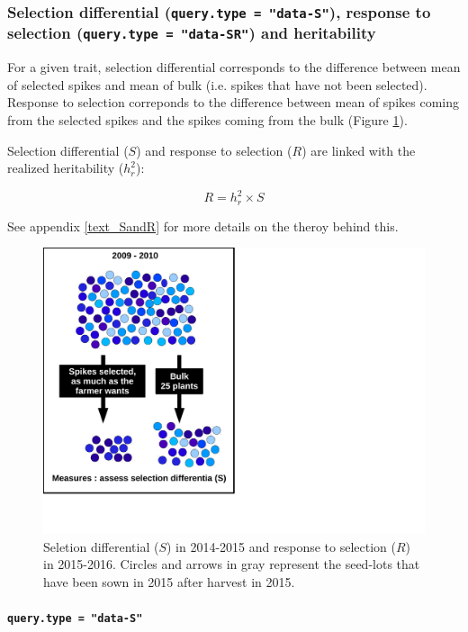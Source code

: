 \documentclass{article}\usepackage[]{graphicx}\usepackage[]{color}
\begin{document}
\subsubsection{Selection differential (\texttt{query.type = "data-S"}), response to selection (\texttt{query.type = "data-SR"}) and heritability}
\label{data-S-and-SR}

For a given trait, selection differential corresponds to the difference between mean of selected spikes and mean of bulk (i.e. spikes that have not been selected).
Response to selection correponds to the difference between mean of spikes coming from the selected spikes and the spikes coming from the bulk (Figure \ref{SandR}).

Selection differential ($S$) and response to selection ($R$) are linked with the realized heritability ($h_{r}^2$):

\begin{displaymath}
R = h_{r}^2 \times S
\end{displaymath}

See appendix \ref{text_SandR} for more details on the theroy behind this.

\begin{figure}[H]
\begin{center}
\includegraphics[page=8, width=.8\textwidth]{SandR_EN.pdf}
\caption{Seletion differential ($S$) in 2014-2015 and response to selection ($R$) in 2015-2016. Circles and arrows in gray represent the seed-lots that have been sown in 2015 after harvest in 2015.}
\label{SandR}
\end{center}
\end{figure}



\paragraph{\texttt{query.type = "data-S"}}
\end{document}
